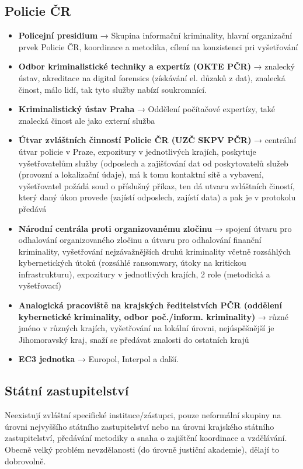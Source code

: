\subsection{Policie ČR}
\begin{itemize}
    \item\textbf{Policejní presidium} → Skupina informační kriminality, hlavní organizační prvek Policie ČR, koordinace a metodika, cílení na konzistenci pri vyšetřování
    \item \textbf{Odbor kriminalistické techniky a expertíz (OKTE PČR)} → znalecký ústav, akreditace na digital forensics (získávání el. důzaků z dat), znalecká činost, málo lidí, tak tyto služby nabízí soukromnící.
    \item \textbf{Kriminalistický ústav Praha} → Oddělení počítačové expertízy, také znalecká činost ale jako externí služba
    \item \textbf{Útvar zvláštních činností Policie ČR (UZČ SKPV PČR)} → centrální útvar policie v Praze, expozitury v jednotlivých krajích, poskytuje vyšetřovatelům služby (odposlech a zajišťování dat od poskytovatelů služeb (provozní a lokalizační údaje), má k tomu kontaktní sítě a vybavení, vyšetřovatel požádá soud o příslušný příkaz, ten dá utvaru zvláštních čiností, který daný úkon provede (zajístí odposlech, zajístí data) a pak je v
    protokolu předává
    \item \textbf{Národní centrála proti organizovanému zločinu} → spojení útvaru pro odhalování organizovaného zločinu a útvaru pro odhalování finanční kriminality, vyšetřování nejzávažnějších druhů kriminality včetně rozsáhlých kybernetických útoků (rozsáhlé
    ransomwary, útoky na kritickou infrastrukturu), expozitury v jednotlivých krajích, 2 role (metodická a vyšetřovací)
    \item \textbf{Analogická pracoviště na krajských ředitelstvích PČR (oddělení kybernetické kriminality,
    odbor poč./inform. kriminality)} → různé jméno v různých krajích, vyšetřování na lokální úrovni, nejúspěšnější je Jihomoravský kraj, snaží se předávat znalosti do ostatních krajů
    \item \textbf{EC3 jednotka} → Europol, Interpol a další.
\end{itemize}

\subsection{Státní zastupitelství}
Neexistují zvláštní specifické instituce/zástupci, pouze neformální skupiny na úrovni nejvyššího
státního zastupitelství nebo na úrovni krajského státního zastupitelství, předávání metodiky a
snaha o zajištění koordinace a vzdělávání. Obecně velký problém nevzdělanosti (do úrovně justiční akademie), dělají to dobrovolně.
